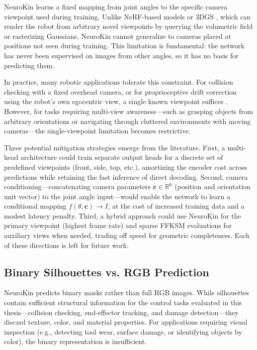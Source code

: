 \documentclass[12pt,a4paper,oneside]{report}
\begin{document}
NeuroKin learns a fixed mapping from joint angles to the specific camera viewpoint used during training. Unlike NeRF-based models \cite{mildenhall2020nerf} or 3DGS \cite{kerbl20233d}, which can render the robot from arbitrary novel viewpoints by querying the volumetric field or rasterizing Gaussians, NeuroKin cannot generalize to cameras placed at positions not seen during training. This limitation is fundamental: the network has never been supervised on images from other angles, so it has no basis for predicting them.

In practice, many robotic applications tolerate this constraint. For collision checking with a fixed overhead camera, or for proprioceptive drift correction using the robot's own egocentric view, a single known viewpoint suffices \cite{hu2024teaching, chen2022full}. However, for tasks requiring multi-view awareness—such as grasping objects from arbitrary orientations or navigating through cluttered environments with moving cameras—the single-viewpoint limitation becomes restrictive.

Three potential mitigation strategies emerge from the literature. First, a multi-head architecture could train separate output heads for a discrete set of predefined viewpoints (front, side, top, etc.), amortizing the encoder cost across predictions while retaining the fast inference of direct decoding. Second, camera conditioning—concatenating camera parameters $\mathbf{c} \in \mathbb{R}^6$ (position and orientation unit vector) to the joint angle input—would enable the network to learn a conditional mapping $f(\theta, \mathbf{c}) \rightarrow I$, at the cost of increased training data and a modest latency penalty. Third, a hybrid approach could use NeuroKin for the primary viewpoint (highest frame rate) and sparse FFKSM evaluations for auxiliary views when needed, trading off speed for geometric completeness. Each of these directions is left for future work.

\subsection{Binary Silhouettes vs. RGB Prediction}
\label{subsec:binary_silhouettes_vs_rgb_prediction}

NeuroKin predicts binary masks rather than full RGB images. While silhouettes contain sufficient structural information for the control tasks evaluated in this thesis—collision checking, end-effector tracking, and damage detection—they discard texture, color, and material properties. For applications requiring visual inspection (e.g., detecting tool wear, surface damage, or identifying objects by color), the binary representation is insufficient.
\end{document}
